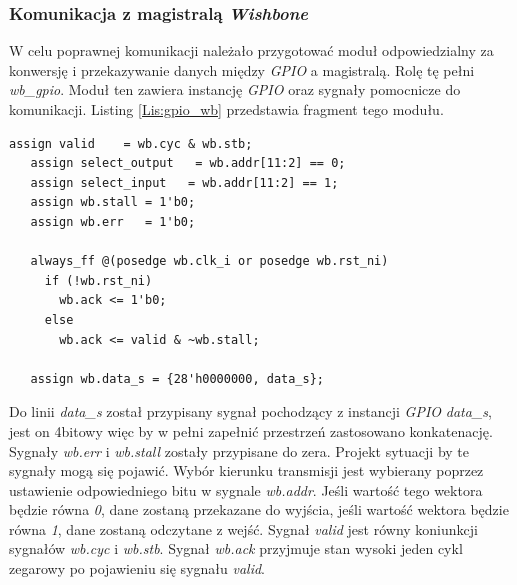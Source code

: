 \documentclass[11pt,a4paper]{article}
\begin{document}
		\subsubsection{Komunikacja z magistralą \textit{Wishbone}}
		\hspace{5mm}	W celu poprawnej komunikacji należało przygotować moduł odpowiedzialny za konwersję i przekazywanie danych między \textit{GPIO} a magistralą. Rolę tę pełni \textit{wb\_gpio}. Moduł ten zawiera instancję \textit{GPIO} oraz sygnały pomocnicze do komunikacji. Listing \ref{Lis:gpio_wb} przedstawia fragment tego modułu.\\
									\begin{minipage}{\textwidth}
\begin{scriptsize}
\begin{lstlisting}[label=Lis:gpio_wb,caption=Komunikacja \textit{GPIO} z magistralą]
   assign valid    = wb.cyc & wb.stb;
   assign select_output   = wb.addr[11:2] == 0;
   assign select_input   = wb.addr[11:2] == 1;
   assign wb.stall = 1'b0;
   assign wb.err   = 1'b0;

   always_ff @(posedge wb.clk_i or posedge wb.rst_ni)
     if (!wb.rst_ni)
       wb.ack <= 1'b0;
     else
       wb.ack <= valid & ~wb.stall;

   assign wb.data_s = {28'h0000000, data_s};   
\end{lstlisting}
\end{scriptsize}
\end{minipage}
		Do linii \textit{data\_s} został przypisany sygnał pochodzący z instancji \textit{GPIO} \textit{data\_s}, jest on 4bitowy więc by w pełni zapełnić przestrzeń zastosowano konkatenację. Sygnały \textit{wb.err} i \textit{wb.stall} zostały przypisane do zera. Projekt sytuacji by te sygnały mogą się pojawić. Wybór kierunku transmisji jest wybierany poprzez ustawienie odpowiedniego bitu w sygnale \textit{wb.addr}. Jeśli wartość tego wektora będzie równa \textit{0}, dane zostaną przekazane do wyjścia, jeśli wartość wektora będzie równa \textit{1}, dane zostaną odczytane z wejść. Sygnał \textit{valid} jest równy koniunkcji sygnałów \textit{wb.cyc} i \textit{wb.stb}. Sygnał \textit{wb.ack} przyjmuje stan wysoki jeden cykl zegarowy po pojawieniu się sygnału \textit{valid}. 
\end{document}

